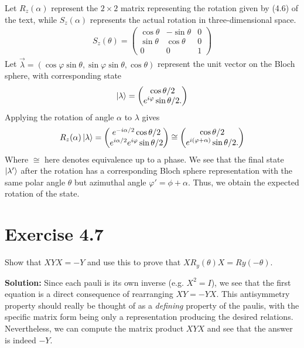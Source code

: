 \documentclass{book}
\begin{document}
    Let $R_{z}(\alpha)$ represent the $2\times 2$ matrix representing the rotation given by (4.6) of the text, while $S_z(\alpha)$ represents the actual rotation in three-dimensional space.
    \begin{align}
        S_z (\theta) = \begin{pmatrix}
            \cos\theta & -\sin\theta & 0\\
            \sin\theta & \cos\theta & 0 \\
            0 & 0 & 1
        \end{pmatrix}
    \end{align}
    Let $\vec{\lambda} = (\cos\varphi \sin\theta, \sin\varphi \sin\theta, \cos\theta)$ represent the unit vector on the Bloch sphere, with corresponding state 
    \begin{align}
        \ket{\lambda} = \begin{pmatrix}
            \cos\theta/2 \\
            e^{i\varphi}\sin\theta/2.
        \end{pmatrix}
    \end{align}
    Applying the rotation of angle $\alpha$ to $\lambda$ gives
    \begin{align}
        R_z(\alpha)\ket{\lambda} = \begin{pmatrix}
            e^{-i\alpha/2}\cos\theta/2 \\
            e^{i\alpha/2}e^{i\varphi} \sin\theta/2
        \end{pmatrix} \cong \begin{pmatrix}
            \cos\theta/2 \\
            e^{i(\varphi + \alpha)} \sin\theta/2.
        \end{pmatrix}
    \end{align}
    Where $\cong$ here denotes equivalence up to a phase. We see that the final state $\ket{\lambda'}$ after the rotation has a corresponding Bloch sphere representation with the same polar angle $\theta$ but azimuthal angle $\varphi' = \phi + \alpha$. Thus, we obtain the expected rotation of the state. 

\section*{Exercise 4.7}
    Show that $XYX = -Y$ and use this to prove that $XR_y(\theta)X = Ry(-\theta)$.
    
    \textbf{Solution:} Since each pauli is its own inverse (e.g. $X^2 = I$), we see that the first equation is a direct consequence of rearranging $XY = - YX$. This antisymmetry property should really be thought of as a \emph{defining} property of the paulis, with the specific matrix form being only a representation producing the desired relations. Nevertheless, we can compute the matrix product $XYX$ and see that the answer is indeed $-Y$.
    
\end{document}
